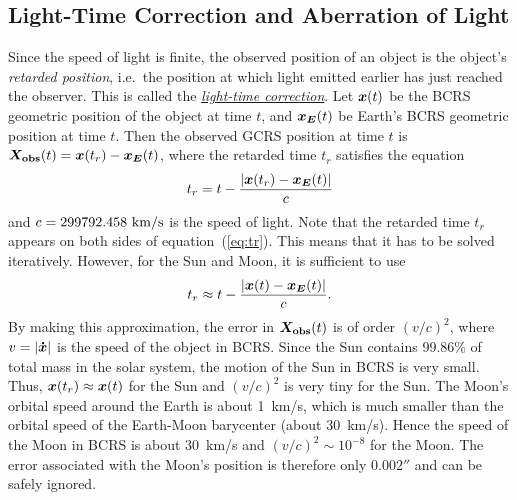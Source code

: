 \documentclass[12pt]{article}
\newcommand \beq {\begin{equation}}
\newcommand \eeq {\end{equation}}
\newcommand{\ve}[1]{\mbox{\boldmath $#1$}}
\begin{document}
\begin{CJK}{UTF8}{bkai}
\section{Light-Time Correction and Aberration of Light}
\label{sec:lighttime}

Since the speed of light is finite, the observed position of an object is the 
object's {\em retarded position}, i.e.\ the position at which light emitted earlier 
has just reached the observer. This is called the 
\href{https://en.wikipedia.org/wiki/Light-time_correction}{\em light-time correction}. 
Let $\ve{x}(t)$ be the BCRS geometric position of the object at time $t$, and 
$\ve{x_E}(t)$ be Earth's BCRS geometric position at time $t$. Then 
the observed GCRS position at time $t$ is $\ve{X_{\rm obs}}(t) = \ve{x}(t_r) - \ve{x_E}(t)$, 
where the retarded time $t_r$ satisfies the equation 
\beq
  t_r = t - \frac{|\ve{x}(t_r) - \ve{x_E}(t)|}{c} 
\label{eq:tr}
\eeq
and $c=299792.458~{\rm km/s}$ is the speed of light. Note that the retarded time 
$t_r$ appears on both sides of equation~(\ref{eq:tr}). This means that it has to be 
solved iteratively. However, for the Sun and Moon, it is sufficient to use 
\beq
  t_r \approx t - \frac{|\ve{x}(t) - \ve{x_E}(t)|}{c} .
\eeq
By making this approximation, the error in $\ve{X_{\rm obs}}(t)$ is of 
order $(v/c)^2$, where $v=|\ve{\dot{x}}|$ is the speed of the object in BCRS. 
Since the Sun contains 99.86\% of total mass in the solar system, the motion of 
the Sun in BCRS is very small. Thus, $\ve{x}(t_r) \approx \ve{x}(t)$ for the Sun 
and $(v/c)^2$ is very tiny for the Sun. The Moon's orbital 
speed around the Earth is about 1~km/s, which is much smaller than the orbital 
speed of the Earth-Moon barycenter (about 30~km/s). Hence the speed of 
the Moon in BCRS is about 30~km/s and $(v/c)^2\sim 10^{-8}$
for the Moon. The error associated with the Moon's position is therefore 
only $0.002''$ and can be safely ignored.


\end{CJK}
\end{document}
